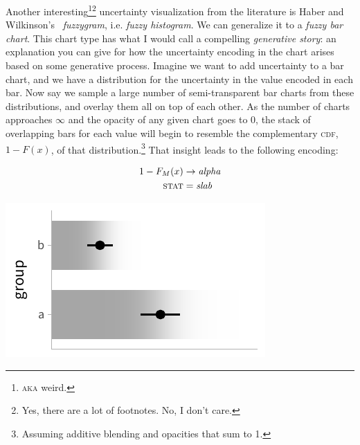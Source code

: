 \documentclass[journal]{vgtc}                     %
\begin{document}
Another interesting\footnote{\textsc{aka} weird.}\footnote{Yes, there are a lot of footnotes. No, I don't care.} uncertainty visualization from the literature is Haber and Wilkinson's~\cite{haber1982perceptual} \textit{fuzzygram}, i.e. \textit{fuzzy histogram}. We can generalize it to a \textit{fuzzy bar chart}. This chart type has what I would call a compelling \textit{generative story}: an explanation you can give for how the uncertainty encoding in the chart arises based on some generative process. Imagine we want to add uncertainty to a bar chart, and we have a distribution for the uncertainty in the value encoded in each bar. Now say we sample a large number of semi-transparent bar charts from these distributions, and overlay them all on top of each other. As the number of charts approaches $\infty$ and the opacity of any given chart goes to 0, the stack of overlapping bars for each value will begin to resemble the complementary \textsc{cdf}, $1 - F(x)$, of that distribution.\footnote{Assuming additive blending and opacities that sum to 1.} That insight leads to the following encoding:

 \noindent
\begin{minipage}{.5\columnwidth}

\begin{align*}
1 - F_M(x) &\rightarrow \textit{alpha}\\
\textsc{stat} &= \mathit{slab}
\end{align*}
\end{minipage}%
  \begin{minipage}{.4\columnwidth}
    \centering
    \includegraphics[width=1.2\columnwidth]{figs/3-slab_fuzzygram.pdf}
  \end{minipage}
\hfill\break
\end{document}
